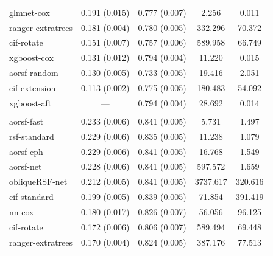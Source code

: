 \documentclass{article}\usepackage[]{graphicx}\usepackage[]{xcolor}
\newenvironment{knitrout}{}{} %
\begin{document}
\begin{knitrout}
\begin{longtable}[t]{lcccc}
\hspace{1em}glmnet-cox & 0.191 (0.015) & 0.777 (0.007) & 2.256 & 0.011\\
\hspace{1em}ranger-extratrees & 0.181 (0.004) & 0.780 (0.005) & 332.296 & 70.372\\
\hspace{1em}cif-rotate & 0.151 (0.007) & 0.757 (0.006) & 589.958 & 66.749\\
\hspace{1em}xgboost-cox & 0.131 (0.012) & 0.794 (0.004) & 11.220 & 0.015\\
\hspace{1em}aorsf-random & 0.130 (0.005) & 0.733 (0.005) & 19.416 & 2.051\\
\hspace{1em}cif-extension & 0.113 (0.002) & 0.775 (0.005) & 180.483 & 54.092\\
\hspace{1em}xgboost-aft & --- & 0.794 (0.004) & 28.692 & 0.014\\
\addlinespace[0.3em]
\multicolumn{5}{l}{\textit{\textbf{ARIC; heart failure, n = 13623, p = 41}}}\\
\hline
\hspace{1em}aorsf-fast & 0.233 (0.006) & 0.841 (0.005) & 5.731 & 1.497\\
\hspace{1em}rsf-standard & 0.229 (0.006) & 0.835 (0.005) & 11.238 & 1.079\\
\hspace{1em}aorsf-cph & 0.229 (0.006) & 0.841 (0.005) & 16.768 & 1.549\\
\hspace{1em}aorsf-net & 0.228 (0.006) & 0.841 (0.005) & 597.572 & 1.659\\
\hspace{1em}obliqueRSF-net & 0.212 (0.005) & 0.841 (0.005) & 3737.617 & 320.616\\
\hspace{1em}cif-standard & 0.199 (0.005) & 0.839 (0.005) & 71.854 & 391.419\\
\hspace{1em}nn-cox & 0.180 (0.017) & 0.826 (0.007) & 56.056 & 96.125\\
\hspace{1em}cif-rotate & 0.172 (0.006) & 0.806 (0.007) & 589.494 & 69.448\\
\hspace{1em}ranger-extratrees & 0.170 (0.004) & 0.824 (0.005) & 387.176 & 77.513\\

\end{longtable}
\end{knitrout}
\end{document}
